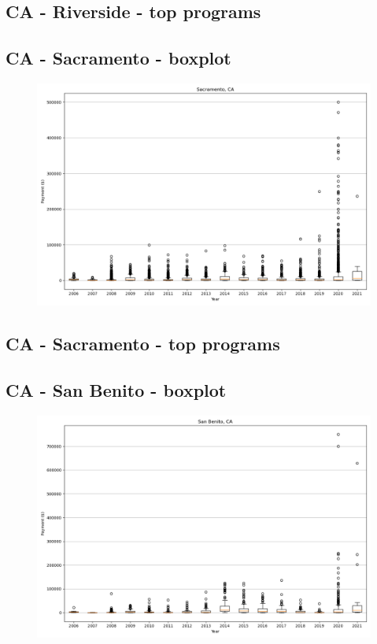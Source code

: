 \subsection*{CA - Riverside - top programs}

\newpage
\subsection*{CA - Sacramento - boxplot}
\begin{figure}[h]
\centering
\includegraphics[width=7in]{../output/boxplots/counties/Sacramento-CA_boxplot.png}
\end{figure}


\subsection*{CA - Sacramento - top programs}

\newpage
\subsection*{CA - San Benito - boxplot}
\begin{figure}[h]
\centering
\includegraphics[width=7in]{../output/boxplots/counties/San Benito-CA_boxplot.png}
\end{figure}


